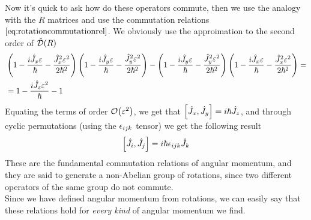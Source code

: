 \documentclass[../qm.tex]{subfiles}
\begin{document}
	Now it's quick to ask how do these operators commute, then we use the analogy with the $R$ matrices and use the commutation relations $\eqref{eq:rotationcommutationrel}$. We obviously use the approimation to the second order of $\hat{\mathcal{D}}(R)$
	\begin{equation*}
		\begin{aligned}
			&\left( 1-\frac{i\hat{J}_x\varepsilon}{\hbar}-\frac{\hat{J}_x^2\varepsilon^2}{2\hbar^2} \right)\left( 1-\frac{i\hat{J}_y\varepsilon}{\hbar}-\frac{\hat{J}_y^2\varepsilon^2}{2\hbar^2} \right)-\left( 1-\frac{i\hat{J}_y\varepsilon}{\hbar}-\frac{\hat{J}_y^2\varepsilon^2}{2\hbar^2} \right)\left( 1-\frac{i\hat{J}_x\varepsilon}{\hbar}-\frac{\hat{J}_x^2\varepsilon^2}{2\hbar^2} \right)=\\
			&= 1-\frac{i\hat{J}_z\varepsilon^2}{\hbar}-1
		\end{aligned}
	\end{equation*}
	Equating the terms of order $\order{\varepsilon^2}$, we get that $\comm{\opr{J}_x}{\opr{J}_y}=i\hbar\opr{J}_z$, and through cyclic permutations (using the $\epsilon_{ijk}$ tensor) we get the following result
	\begin{equation}
		\comm{\opr{J}_i}{\opr{J}_j}=i\hbar\lc{ijk}\opr{J}_k
		\label{eq:commrelangmom}
	\end{equation}
	These are the fundamental commutation relations of angular momentum, and they are said to generate a non-Abelian group of rotations, since two different operators of the same group do not commute.\\
	Since we have defined angular momentum from rotations, we can easily say that these relations hold for \emph{every kind} of angular momentum we find.
\end{document}
